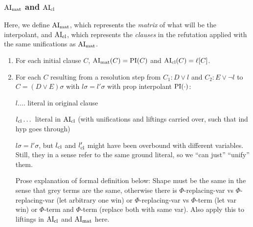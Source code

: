 \documentclass[,%
	paper=a4,%
	twoside=false,%
	liststotoc,
	bibtotoc,
	draft=false,%
	numbers=noendperiod
]{scrartcl}
\begin{document}
\subsubsection{$\operatorname{AI}_\mathrm{mat}$ and $\operatorname{AI}_\mathrm{cl}$}

Here, we define $\operatorname{AI}_\mathrm{mat}$, which represents the \emph{matrix} of what will be the interpolant, and $\operatorname{AI}_\mathrm{cl}$, which represents the \emph{clauses} in the refutation applied with the same unifications as $\operatorname{AI}_\mathrm{mat}$.

\begin{enumerate}
	\item 
		For each initial clause $C$, $\operatorname{AI}_\mathrm{mat}(C) = \operatorname{PI}(C)$ and $\operatorname{AI}_\mathrm{cl}(C) = \ell[C]$.

	\item
		For each $C$ resulting from a resolution step from $C_1: D\lor l$ and $C_2: E\lor \lnot l$ to $C = (D \lor E)\sigma$ with $l\sigma = l'\sigma$ with prop interpolant $\operatorname{PI}(\cdot)$:

		$l.\dotsc$ literal in original clause

		$l_\mathrm{cl}\dotsc$ literal in $\operatorname{AI}_\mathrm{cl}$ (with unifications and liftings carried over, such that ind hyp goes through)


		$l\sigma = l'\sigma$, but $l_\mathrm{cl}$ and $l_\mathrm{cl}'$ might have been overbound with different variables. Still, they in a sense refer to the same ground literal, so we ``can just'' ``unify'' them.
		
		Prose explanation of formal definition below: Shape must be the same in the sense that grey terms are the same, otherwise there is $\Phi$-replacing-var vs $\Phi$-replacing-var (let arbitrary one win) or $\Phi$-replacing-var vs $\Phi$-term (let var win) or $\Phi$-term and $\Phi$-term (replace both with same var). 
		Also apply this to liftings in $\operatorname{AI}_\mathrm{cl}$ and $\operatorname{AI}_\mathrm{mat}$ here.


\end{enumerate}
\end{document}
